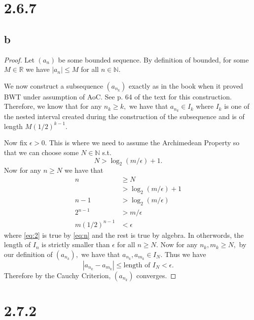 \documentclass[10pt]{article}
\begin{document}
\section*{2.6.7}

\subsection*{b}

\begin{proof}
    Let $(a_n)$ be some bounded sequence. By definition of bounded, for some $M\in\mathbb{R}$ we have $|a_n|\le M$ for all $n\in\mathbb{N}.$ 
    
    We now construct a subsequence $(a_{n_k})$ exactly as in the book when it proved BWT under assumption of AoC. See p. 64  of the text for this construction.
    Therefore, we know that for any $n_k\ge k,$ we have that $a_{n_k} \in I_k$ where $I_k$ is one of the nested interval created during the construction of the subsequence and is of length $M(1/2)^{k-1}.$ 
    
    Now fix $\epsilon>0.$ This is where we need to assume the Archimedean Property so that we can choose some $N\in\mathbb{N}$ s.t.
    \begin{equation} \label{eq:n}
        N > \log_{2}(m/\epsilon) +1.
    \end{equation}
    Now for any $n\ge N$ we have that
    \begin{align}
        n&\ge N\nonumber\\
        &> \log_{2}(m/\epsilon) +1\label{eq:2}\\
        n - 1  &> \log_{2}(m/\epsilon)\nonumber\\
        2^{n-1} &> m/\epsilon\nonumber\\
        m(1/2)^{n-1} &< \epsilon\nonumber
    \end{align}
    where \eqref{eq:2} is true by \eqref{eq:n} and the rest is true by algebra.
    In otherwords, the length of $I_n$ is strictly smaller than $\epsilon$ for all $n\ge N.$ Now for any $n_k,m_k\ge N,$ by our definition of $(a_{n_k}),$ we have that $a_{n_k},a_{m_k}\in I_N.$ Thus we have
    \[|a_{n_k}-a_{m_k}| \le \text{length of }I_N < \epsilon.\]
    Therefore by the Cauchy Criterion, $(a_{n_k})$ converges.
\end{proof}

\section*{2.7.2}
\end{document}
